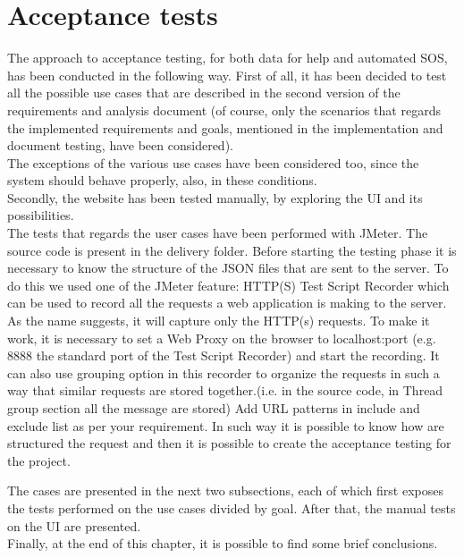 \section{Acceptance tests}
The approach to acceptance testing, for both data for help and automated SOS, has been
conducted in the following way. 
First of all, it has been decided to test all the possible use cases that are described in the
second version of the requirements and analysis document (of course, only the scenarios that
regards the implemented requirements and goals, mentioned in the implementation and document testing, have been considered). \\
The exceptions of the various use cases have been considered too, since the system should
behave properly, also, in these conditions. \\
Secondly, the website has been tested manually, by exploring the UI and its possibilities. \\

The tests that regards the user cases have been performed with JMeter. The source code is present in the delivery folder. 
Before starting the testing phase it is necessary to know the structure of the JSON files that are sent to the server. To do this we used
one of the JMeter feature: HTTP(S) Test Script Recorder which can be used to record all the requests a web
application is making to the server. As the name suggests, it will capture only the HTTP(s) requests. To make it work, it is necessary to set a Web Proxy on the browser to localhost:port (e.g. 8888 the standard port of the Test Script Recorder) and start the recording. It can also use grouping option in this
recorder to organize the requests in such a way that similar requests are stored together.(i.e. in the source code, in Thread group section
all the message are stored) Add URL patterns in include and exclude list as per your requirement. In such way it is possible to know how are
structured the request and then it is possible to create the acceptance testing for the project.

\par
The cases are presented in the next two subsections, each of which first exposes the
tests performed on the use cases divided by goal. After that, the manual tests on the UI are presented. \\
Finally, at the end of this chapter, it is possible to find some brief conclusions. 




